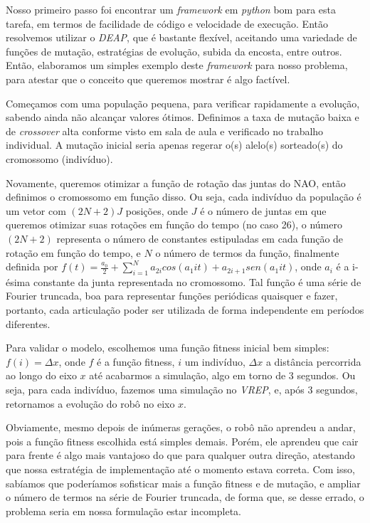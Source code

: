 \documentclass[twoside,conference,a4paper]{IEEEtran}
\begin{document}
Nosso primeiro passo foi encontrar um \textsl{framework} em \textsl{python} bom para esta tarefa, em termos de facilidade de código e velocidade de execução. Então resolvemos utilizar o \textsl{DEAP}\cite{deap}, que é bastante flexível, aceitando uma variedade de funções de mutação, estratégias de evolução, subida da encosta, entre outros. Então, elaboramos um simples exemplo deste \textsl{framework} para nosso problema, para atestar que o conceito que queremos mostrar é algo factível.

Começamos com uma população pequena, para verificar rapidamente a evolução, sabendo ainda não alcançar valores ótimos. Definimos a taxa de mutação baixa e de \textsl{crossover} alta conforme visto em sala de aula e verificado no trabalho individual. A mutação inicial seria apenas regerar o(s) alelo(s) sorteado(s) do cromossomo (indivíduo).

Novamente, queremos otimizar a função de rotação das juntas do NAO, então definimos o cromossomo em função disso. Ou seja, cada indivíduo da população é um vetor com $(2N+2)J$ posições, onde $J$ é o número de juntas em que queremos otimizar suas rotações em função do tempo (no caso 26), o número $(2N+2)$ representa o número de constantes estipuladas em cada função de rotação em função do tempo, e $N$ o número de termos da função, finalmente definida por $f(t) = \frac{a_0}{2}+\sum_{i=1}^N a_{2i} cos(a_{1} i t) + a_{2i+1} sen(a_{1} i t)$, onde $a_i$ é a i-ésima constante da junta representada no cromossomo. Tal função é uma série de Fourier truncada, boa para representar funções periódicas quaisquer e fazer, portanto, cada articulação poder ser utilizada de forma independente em períodos diferentes.

Para validar o modelo, escolhemos uma função fitness inicial bem simples: $f(i)=\Delta x$, onde $f$ é a função fitness, $i$ um indivíduo, $\Delta x$ a distância percorrida ao longo do eixo $x$ até acabarmos a simulação, algo em torno de 3 segundos. Ou seja, para cada indivíduo, fazemos uma simulação no \textsl{VREP}, e, após 3 segundos, retornamos a evolução do robô no eixo $x$.

Obviamente, mesmo depois de inúmeras gerações, o robô não aprendeu a andar, pois a função fitness escolhida está simples demais. Porém, ele aprendeu que cair para frente é algo mais vantajoso do que para qualquer outra direção, atestando que nossa estratégia de implementação até o momento estava correta. Com isso, sabíamos que poderíamos sofisticar mais a função fitness e de mutação, e ampliar o número de termos na série de Fourier truncada, de forma que, se desse errado, o problema seria em nossa formulação estar incompleta.
\end{document}
